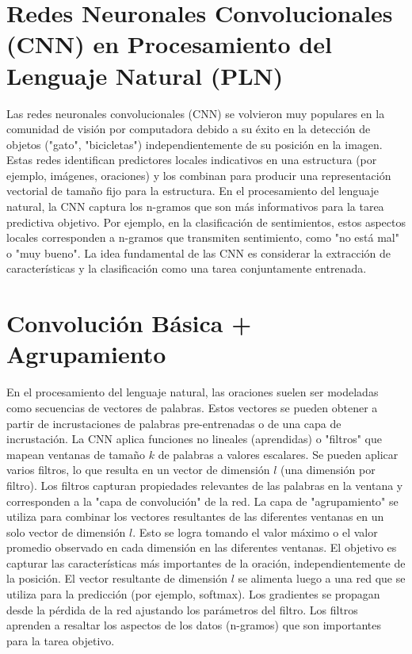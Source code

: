 
\section{Redes Neuronales Convolucionales (CNN) en Procesamiento del Lenguaje Natural (PLN)}

Las redes neuronales convolucionales (CNN) se volvieron muy populares en la comunidad de visión por computadora debido a su éxito en la detección de objetos ("gato", "bicicletas") independientemente de su posición en la imagen. Estas redes identifican predictores locales indicativos en una estructura (por ejemplo, imágenes, oraciones) y los combinan para producir una representación vectorial de tamaño fijo para la estructura. En el procesamiento del lenguaje natural, la CNN captura los n-gramos que son más informativos para la tarea predictiva objetivo. Por ejemplo, en la clasificación de sentimientos, estos aspectos locales corresponden a n-gramos que transmiten sentimiento, como "no está mal" o "muy bueno". La idea fundamental de las CNN \cite{lecun1998gradient} es considerar la extracción de características y la clasificación como una tarea conjuntamente entrenada.

\section{Convolución Básica + Agrupamiento}

En el procesamiento del lenguaje natural, las oraciones suelen ser modeladas como secuencias de vectores de palabras. Estos vectores se pueden obtener a partir de incrustaciones de palabras pre-entrenadas o de una capa de incrustación. La CNN aplica funciones no lineales (aprendidas) o "filtros" que mapean ventanas de tamaño $k$ de palabras a valores escalares. Se pueden aplicar varios filtros, lo que resulta en un vector de dimensión $l$ (una dimensión por filtro). Los filtros capturan propiedades relevantes de las palabras en la ventana y corresponden a la "capa de convolución" de la red. La capa de "agrupamiento" se utiliza para combinar los vectores resultantes de las diferentes ventanas en un solo vector de dimensión $l$. Esto se logra tomando el valor máximo o el valor promedio observado en cada dimensión en las diferentes ventanas. El objetivo es capturar las características más importantes de la oración, independientemente de la posición. El vector resultante de dimensión $l$ se alimenta luego a una red que se utiliza para la predicción (por ejemplo, softmax). Los gradientes se propagan desde la pérdida de la red ajustando los parámetros del filtro. Los filtros aprenden a resaltar los aspectos de los datos (n-gramos) que son importantes para la tarea objetivo.

